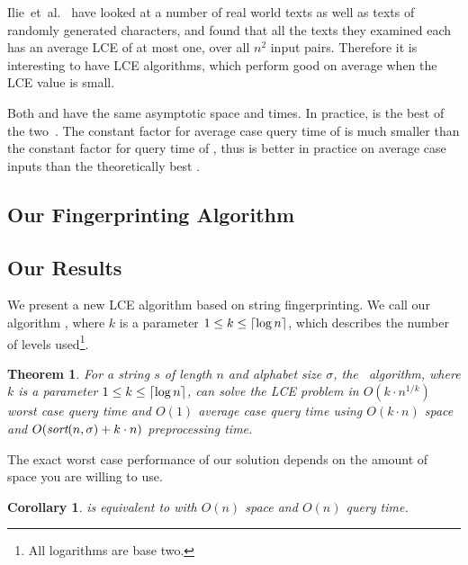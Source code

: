 \documentclass[a4]{article}
\newtheorem{theorem}{Theorem}
\newtheorem{corollary}{Corollary}
\begin{document}
Ilie~et~al.~\cite{ilie-navarro-tinta} have looked at a number of real world texts as well as texts of randomly generated characters, and found that all the texts they examined each has an average LCE of at most one, over all $n^2$ input pairs. Therefore it is interesting to have LCE algorithms, which perform good on average when the LCE value is small.

Both  and  have the same asymptotic space and times. In practice,  is the best of the two~\cite{ilie-navarro-tinta}. The constant factor for average case query time of  is much smaller than the constant factor for query time of , thus  is better in practice on average case inputs than the theoretically best .

\ifreport
\subsection{Our Fingerprinting Algorithm}
\fi %
\ifarticle
\subsection{Our Results}
\fi %

We present a new LCE algorithm based on string fingerprinting. We call our algorithm \fprintk, where $k$ is a parameter $1\leq k\leq\lceil\log n\rceil$, which describes the number of levels used\footnote{All logarithms are base two.}.

\begin{theorem}
For a string $s$ of length $n$ and alphabet size $\sigma$, the \fprintk\ algorithm, where $k$ is a parameter $1 \leq k \leq \lceil\log n\rceil$, can solve the LCE problem in $O(k\cdot n^{1/k})$ worst case query time and $O(1)$ average case query time using $O(k\cdot n)$ space and $O(\textit{sort}(n,\sigma) + k\cdot n)$ preprocessing time.
\end{theorem}

The exact worst case performance of our solution depends on the amount of space you are willing to use.

\begin{corollary}
\fprint[1] is equivalent to  with $O(n)$ space and $O(n)$ query time.
\end{corollary}
\end{document}
